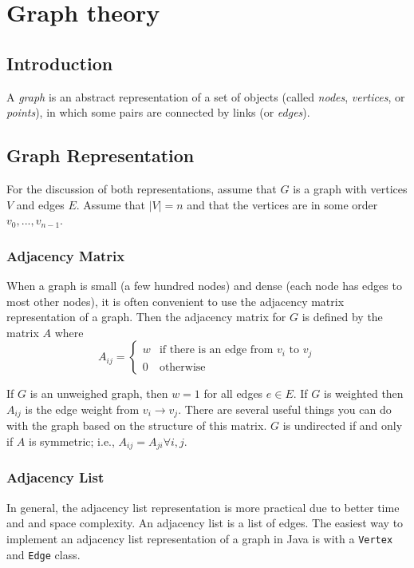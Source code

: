 \documentclass[a4paper,12pt]{article}
\begin{document}
\newpage\section{Graph theory}

\subsection{Introduction}

A {\em graph} is an abstract representation of a set of objects (called {\em nodes}, {\em vertices}, or {\em points}), in which some pairs are connected by links (or {\em edges}).

\subsection{Graph Representation}

For the discussion of both representations, assume that $G$ is a graph with vertices $V$ and edges $E$. Assume that $|V| = n$ and that the vertices are in some order $v_0, ..., v_{n-1}$. 

\subsubsection{Adjacency Matrix}

When a graph is small (a few hundred nodes) and dense (each node has edges to most other nodes), it is often convenient to use the adjacency matrix representation of a graph. Then the adjacency matrix for $G$ is defined by the matrix $A$ where 
\[
A_{ij} = \begin{cases}
w & \text{if there is an edge from $v_i$ to $v_j$} \\
0 & \text{otherwise}
\end{cases}
\]

If $G$ is an unweighed graph, then $w = 1$ for all edges $e \in E$. If $G$ is weighted then $A_{ij}$ is the edge weight from $v_i \to v_j$. There are several useful things you can do with the graph based on the structure of this matrix. $G$ is undirected if and only if $A$ is symmetric; i.e., $A_{ij} = A_{ji} \forall i,j$.

\subsubsection{Adjacency List}

In general, the adjacency list representation is more practical due to better time and and space complexity. An adjacency list is a list of edges. The easiest way to implement an adjacency list representation of a graph in Java is with a \lstinline/Vertex/ and \lstinline/Edge/ class.
\end{document}
